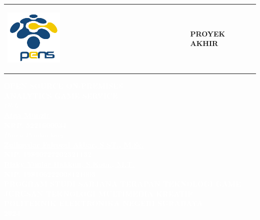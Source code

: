 \documentclass[10pt]{extarticle}
\begin{document}
\begin{table}[t]
    \centering
    \begin{tabular}{@{}m{}@{}m{}@{}}
        \begin{flushleft}
            \includegraphics[width=0.3\textwidth]{Logo_PENS.png}
            \vspace{10pt}
        \end{flushleft}
         &
        \begin{flushright}
            \textbf{PROYEK AKHIR}
            \vspace{10pt}
        \end{flushright}
    \end{tabular}
\end{table}

\begin{table}[t]
    \centering\textcolor{white}{\textbf{\fontsize{12pt}{14pt}\selectfont OPEN SOURCE ON-PREMISES\\ANALYTICS GAME SERVICE}}\\[2cm]

    \centering\textcolor{white}{\textit{Oleh:}}\\
    \centering\textcolor{white}{\textbf{\underline{Atqa Munzir}\\NRP. 5221600034}}\\[1cm]

    \centering\textcolor{white}{\textit{Dosen Pembimbing:}}\\
    \centering\textcolor{white}{\textbf{\underline{Zulhaydar Fairozal Akbar, S.ST., M.Sc.}\\NIP. 19890727202321132}}\\[10pt]
    \centering\textcolor{white}{\textbf{\underline{Rizky Yuniar Hakkun, S.Kom., M.T.}\\NIP. 198106222008121003}}\\[2cm]

    \centering\textcolor{white}{\textbf{PROGRAM STUDI SARJANA TERAPAN TEKNOLOGI GAME\\JURUSAN TEKNOLOGI MULTIMEDIA KREATIF\\POLITEKNIK ELEKTRONIKA NEGERI SURABAYA\\2024}}\\[5pt]
\end{table}
\end{document}
